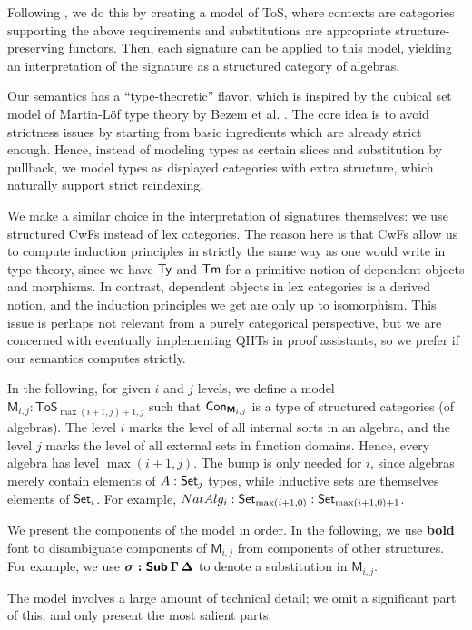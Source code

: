 \documentclass[sigplan,review,anonymous]{acmart}\settopmatter{printfolios=true,printccs=false,printacmref=false}
\newcommand{\ToS}{\mathsf{ToS}}
\newcommand{\bM}{\boldsymbol{\mathsf{M}}}
\begin{document}
Following \cite{kaposi2019constructing}, we do this by creating a model of ToS,
where contexts are categories supporting the above requirements and
substitutions are appropriate structure-preserving functors. Then, each signature can be applied to this model, yielding an interpretation of the signature
as a structured category of algebras.

Our semantics has a ``type-theoretic'' flavor, which is inspired by the cubical
set model of Martin-Löf type theory by Bezem et al. \cite{cubical}. The core idea
is to avoid strictness issues by starting from basic ingredients which are already
strict enough. Hence, instead of modeling types as certain slices and
substitution by pullback, we model types as displayed categories with extra
structure, which naturally support strict reindexing.

We make a similar choice in the interpretation of signatures themselves: we use
structured CwFs instead of lex categories. The reason here is that CwFs allow us
to compute induction principles in strictly the same way as one would write in
type theory, since we have $\mathsf{Ty}$ and $\mathsf{Tm}$ for a primitive notion of dependent
objects and morphisms. In contrast, dependent objects in lex categories is a
derived notion, and the induction principles we get are only up to
isomorphism. This issue is perhaps not relevant from a purely categorical
perspective, but we are concerned with eventually implementing QIITs in proof
assistants, so we prefer if our semantics computes strictly.

In the following, for given $i$ and $j$ levels, we define a model $\bM_{i,j} :
\ToS_{\max(i+1,j)+1, j}$ such that $\Con_{\bM_{i,j}}$ is a type of structured
categories (of algebras). The level $i$ marks the level of all internal sorts in
an algebra, and the level $j$ marks the level of all external sets in function
domains. Hence, every algebra has level $\max(i+1,j)$. The bump is only needed
for $i$, since algebras merely contain elements of $A : \mathsf{Set}_j$ types, while
inductive sets are themselves elements of $\mathsf{Set}_i$. For example, $NatAlg_i :
\mathsf{Set}_{\max(i+1,0)} : \mathsf{Set}_{\max(i+1, 0)+1}$.


We present the components of the model in order. In the following, we use
\textbf{bold} font to disambiguate components of $\bM_{i,j}$ from components of other
structures. For example, we use $\boldsymbol{\sigma : \mathsf{Sub}\,\Gamma\,\Delta}$ to
denote a substitution in $\bM_{i,j}$.

The model involves a large amount of technical detail; we omit a significant
part of this, and only present the most salient parts.
\end{document}
